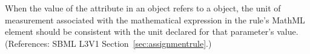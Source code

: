 When the value of the attribute  in an \AssignmentRule
object refers to a \Parameter object, the unit of measurement associated
with the mathematical expression in the rule's MathML  element
should be consistent with the unit declared for that parameter's value.
(References: SBML L3V1 Section~\ref{sec:assignmentrule}.)
